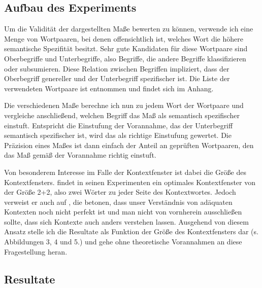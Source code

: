\documentclass[11pt,numbers=noenddot]{scrartcl}
\begin{document}
\subsection{Aufbau des Experiments} \label{aufbau}

Um die Validität der dargestellten Maße bewerten zu können, verwende ich eine Menge von Wortpaaren, bei denen offensichtlich ist, welches Wort die höhere semantische Spezifität besitzt. Sehr gute Kandidaten für diese Wortpaare sind Oberbegriffe und Unterbegriffe, also Begriffe, die andere Begriffe klassifizieren oder subsumieren. Diese Relation zwischen Begriffen impliziert, dass der Oberbegriff genereller und der Unterbegriff spezifischer ist. Die Liste der verwendeten Wortpaare ist \citet{Caraballo99determiningthe} entnommen und findet sich im Anhang.

Die verschiedenen Maße berechne ich nun zu jedem Wort der Wortpaare und vergleiche anschließend, welchen Begriff das Maß als semantisch spezifischer einstuft. Entspricht die Einstufung der Vorannahme, das der Unterbegriff semantisch spezifischer ist, wird das als richtige Einstufung gewertet. Die Präzision eines Maßes ist dann einfach der Anteil an geprüften Wortpaaren, den das Maß gemäß der Vorannahme richtig einstuft.

Von besonderem Interesse im Falle der Kontextfenster ist dabei die Größe des Kontextfensters. \citet[S. 68]{sahlgren2006word} findet in seinen Experimenten ein optimales Kontextfenster von der Größe 2+2, also zwei Wörter zu jeder Seite des Kontextwortes. Jedoch verweist er auch auf \citet{Miller2000-MILLRF}, die betonen, dass unser Verständnis von adäquaten Kontexten noch nicht perfekt ist und man nicht von vornherein ausschließen sollte, dass sich Kontexte auch anders verstehen lassen. Ausgehend von diesem Ansatz stelle ich die Resultate als Funktion der Größe des Kontextfensters dar (s. Abbildungen 3, 4 und 5.) und gehe ohne theoretische Vorannahmen an diese Fragestellung heran.

\subsection{Resultate}
\end{document}
